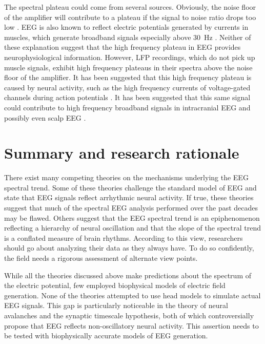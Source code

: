 The spectral plateau could come from several sources. Obviously, the noise floor of the amplifier will contribute to a plateau if the signal to noise ratio drops too low \cite{Scheer2006}. EEG is also known to reflect electric potentials generated by currents in muscles, which generate broadband signals especially above \qty{30}{\hertz} \cite{Muthukumaraswamy2013}. Neither of these explanation suggest that the high frequency plateau in EEG provides neurophysiological information. However, LFP recordings, which do not pick up muscle signals, exhibit high frequency plateaus in their spectra above the noise floor of the amplifier. It has been suggested that this high frequency plateau is caused by neural activity, such as the high frequency currents of voltage-gated channels during action potentials \cite{Ray2008, Ray2011, Gao2016, Zanos2010}. It has been suggested that this same signal could contribute to high frequency broadband signals in intracranial EEG and possibly even scalp EEG \cite{Ray2008}.

\section{Summary and research rationale}

There exist many competing theories on the mechanisms underlying the EEG spectral trend. Some of these theories challenge the standard model of EEG and state that EEG signals reflect arrhythmic neural activity. If true, these theories suggest that much of the spectral EEG analysis performed over the past decades may be flawed. Others suggest that the EEG spectral trend is an epiphenomenon reflecting a hierarchy of neural oscillation and that the slope of the spectral trend is a conflated measure of brain rhythms. According to this view, researchers should go about analyzing their data as they always have. To do so confidently, the field needs a rigorous assessment of alternate view points.

While all the theories discussed above make predictions about the spectrum of the electric potential, few employed biophysical models of electric field generation. None of the theories attempted to use head models to simulate actual EEG signals. This gap is particularly noticeable in the theory of neural avalanches and the synaptic timescale hypothesis, both of which controversially propose that EEG reflects non-oscillatory neural activity. This assertion needs to be tested with biophysically accurate models of EEG generation.


